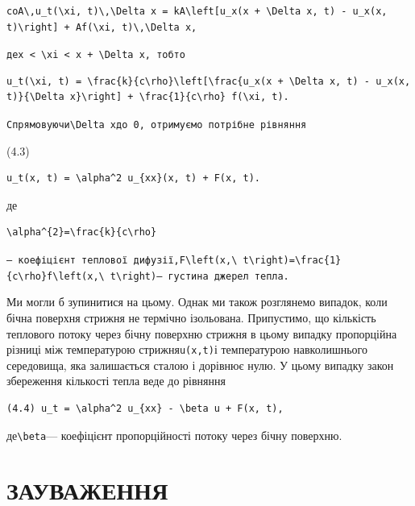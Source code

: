 \documentclass[
  ukrainian,
]{article}
\begin{document}
\begin{verbatim}
coA\,u_t(\xi, t)\,\Delta x = kA\left[u_x(x + \Delta x, t) - u_x(x, t)\right] + Af(\xi, t)\,\Delta x,
\end{verbatim}

\texttt{де\textquotesingle{}x\ \textless{}\ \textbackslash{}xi\ \textless{}\ x\ +\ \textbackslash{}Delta\ x\textquotesingle{},\ тобто}

\begin{verbatim}
u_t(\xi, t) = \frac{k}{c\rho}\left[\frac{u_x(x + \Delta x, t) - u_x(x, t)}{\Delta x}\right] + \frac{1}{c\rho} f(\xi, t).
\end{verbatim}

\texttt{Спрямовуючи\textquotesingle{}\textbackslash{}Delta\ x\textquotesingle{}до\ 0,\ отримуємо\ потрібне\ рівняння}

(4.3)

\begin{verbatim}
u_t(x, t) = \alpha^2 u_{xx}(x, t) + F(x, t).
\end{verbatim}

де

\begin{verbatim}
\alpha^{2}=\frac{k}{c\rho}
\end{verbatim}

\texttt{—\ коефіцієнт\ теплової\ дифузії,\textquotesingle{}F\textbackslash{}left(x,\textbackslash{}\ t\textbackslash{}right)=\textbackslash{}frac\{1\}\{c\textbackslash{}rho\}f\textbackslash{}left(x,\textbackslash{}\ t\textbackslash{}right)\textquotesingle{}—\ густина\ джерел\ тепла.}

Ми могли б зупинитися на цьому. Однак ми також розглянемо випадок, коли
бічна поверхня стрижня не термічно ізольована. Припустимо, що кількість
теплового потоку через бічну поверхню стрижня в цьому випадку
пропорційна різниці між температурою стрижня\texttt{u(x,t)}і
температурою навколишнього середовища, яка залишається сталою і дорівнює
нулю. У цьому випадку закон збереження кількості тепла веде до рівняння

\begin{verbatim}
(4.4) u_t = \alpha^2 u_{xx} - \beta u + F(x, t),
\end{verbatim}

де\texttt{\textbackslash{}beta}--- коефіцієнт пропорційності потоку
через бічну поверхню.

\section{ЗАУВАЖЕННЯ}\label{ux437ux430ux443ux432ux430ux436ux435ux43dux43dux44f-1}
\end{document}
